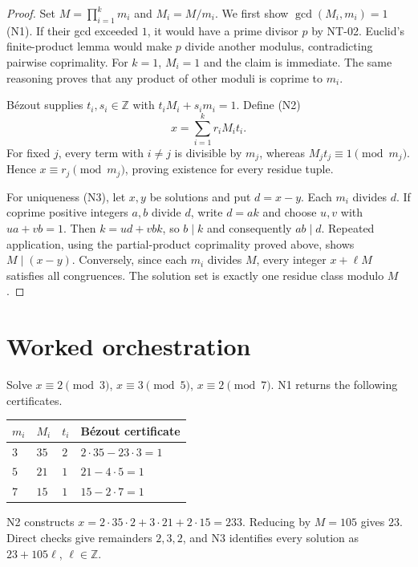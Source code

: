\documentclass[preprint,12pt,aps,pra,showkeys,amsmath,amssymb,superscriptaddress,floatfix]{revtex4-2}
\theoremstyle{definition}
\theoremstyle{remark}
\begin{document}
\begin{proof}

Set \(M=\prod_{i=1}^k m_i\) and \(M_i=M/m_i\). We first show
\(\gcd(M_i,m_i)=1\) (N1). If their gcd exceeded \(1\), it would have a
prime divisor \(p\) by NT-02. Euclid's finite-product lemma would make
\(p\) divide another modulus, contradicting pairwise coprimality. For
\(k=1\), \(M_i=1\) and the claim is immediate. The same reasoning proves
that any product of other moduli is coprime to \(m_i\).

Bézout supplies \(t_i,s_i\in\mathbb Z\) with \(t_iM_i+s_im_i=1\). Define
(N2) \[x=\sum_{i=1}^k r_iM_it_i.\] For fixed \(j\), every term with
\(i\ne j\) is divisible by \(m_j\), whereas \(M_jt_j\equiv1\pmod{m_j}\).
Hence \(x\equiv r_j\pmod{m_j}\), proving existence for every residue
tuple.

For uniqueness (N3), let \(x,y\) be solutions and put \(d=x-y\). Each
\(m_i\) divides \(d\). If coprime positive integers \(a,b\) divide
\(d\), write \(d=ak\) and choose \(u,v\) with \(ua+vb=1\). Then
\(k=ud+vbk\), so \(b\mid k\) and consequently \(ab\mid d\). Repeated
application, using the partial-product coprimality proved above, shows
\(M\mid(x-y)\). Conversely, since each \(m_i\) divides \(M\), every
integer \(x+\ell M\) satisfies all congruences. The solution set is
exactly one residue class modulo \(M\).

\end{proof}

\section{Worked orchestration}

Solve \(x\equiv2\pmod3\), \(x\equiv3\pmod5\), \(x\equiv2\pmod7\). N1
returns the following certificates.

\begin{longtable}[]{@{}llll@{}}
\toprule\noalign{}
\(m_i\) & \(M_i\) & \(t_i\) & Bézout certificate \\
\midrule\noalign{}
\endhead
\bottomrule\noalign{}
\endlastfoot
\(3\) & \(35\) & \(2\) & \(2\cdot35-23\cdot3=1\) \\
\(5\) & \(21\) & \(1\) & \(21-4\cdot5=1\) \\
\(7\) & \(15\) & \(1\) & \(15-2\cdot7=1\) \\
\end{longtable}

N2 constructs \(x=2\cdot35\cdot2+3\cdot21+2\cdot15=233\). Reducing by
\(M=105\) gives \(23\). Direct checks give remainders \(2,3,2\), and N3
identifies every solution as \(23+105\ell\), \(\ell\in\mathbb Z\).
\end{document}
